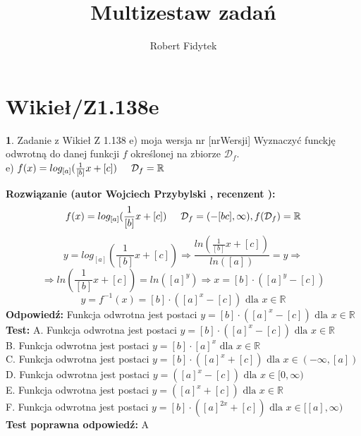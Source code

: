 \documentclass[12pt, a4paper]{article}
\title{Multizestaw zadań}
\author{Robert Fidytek}
\date{}
\theoremstyle{definition} %
\newtheorem{zad}{}
\newcommand{\kategoria}[1]{\section{#1}} %
\newcommand{\zadStart}[1]{\begin{zad}#1\newline} %
\newcommand{\zadStop}{\end{zad}}   %
\newcommand{\rozwStart}[2]{\noindent \textbf{Rozwiązanie (autor #1 , recenzent #2): }\newline} %
\newcommand{\rozwStop}{\newline}                                            %
\newcommand{\odpStart}{\noindent \textbf{Odpowiedź:}\newline}    %
\newcommand{\odpStop}{\newline}                                             %
\newcommand{\testStart}{\noindent \textbf{Test:}\newline} %
\newcommand{\testStop}{\newline} %
\newcommand{\kluczStart}{\noindent \textbf{Test poprawna odpowiedź:}\newline} %
\newcommand{\kluczStop}{\newline} %
\begin{document}
\maketitle


\kategoria{Wikieł/Z1.138e}
\zadStart{Zadanie z Wikieł Z 1.138 e) moja wersja nr [nrWersji]}
Wyznaczyć funckję odwrotną do danej funkcji $f$ określonej na zbiorze $\mathcal{D}_{f}$.\\
e) $f(x)=log_{[a]}(\frac{1}{[b]}x+[c])\hspace{5mm}\mathcal{D}_{f}=\mathbb{R}$
\zadStop
\rozwStart{Wojciech Przybylski}{}
$$f(x)=log_{[a]}(\frac{1}{[b]}x+[c])\hspace{5mm} \mathcal{D}_{f}=(-[bc],\infty), f(\mathcal{D}_{f})=\mathbb{R}$$
$$y=log_{[a]}(\frac{1}{[b]}x+[c])\Rightarrow \frac{ln(\frac{1}{[b]}x+[c])}{ln([a])}=y \Rightarrow $$
$$\Rightarrow ln(\frac{1}{[b]}x+[c])=ln([a]^{y}) \Rightarrow x=[b]\cdot([a]^{y}-[c])$$
$$y=f^{-1}(x)=[b]\cdot([a]^{x}-[c]) \mbox{ dla } x\in \mathbb{R}$$
\rozwStop
\odpStart
Funkcja odwrotna jest postaci $y=[b]\cdot([a]^{x}-[c]) \mbox{ dla }x\in \mathbb{R}$
\odpStop
\testStart
A. Funkcja odwrotna jest postaci $y=[b]\cdot([a]^{x}-[c])  \mbox{ dla }x\in\mathbb{R}$\\
B. Funkcja odwrotna jest postaci $y=[b]\cdot[a]^{x} \mbox{ dla }x\in\mathbb{R}$\\
C. Funkcja odwrotna jest postaci $y=[b]\cdot([a]^{x}+[c])  \mbox{ dla }x\in(-\infty,[a])$\\
D. Funkcja odwrotna jest postaci $y=([a]^{x}-[c]) \mbox{ dla }x\in[0,\infty)$\\
E. Funkcja odwrotna jest postaci $y=([a]^{x}+[c]) \mbox{ dla }x\in \mathbb{R}$\\
F. Funkcja odwrotna jest postaci $y=[b]\cdot([a]^{2x}+[c])\mbox{ dla }x\in[[a],\infty)$
\testStop
\kluczStart
A
\kluczStop
\end{document}
